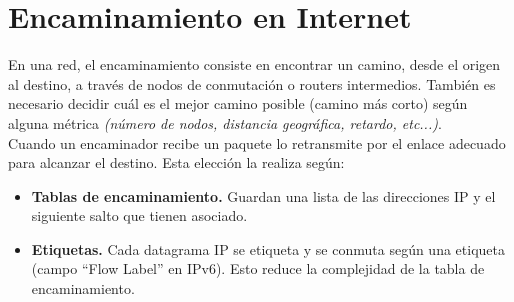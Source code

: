 \section{Encaminamiento en Internet}
En una red, el encaminamiento consiste en encontrar un camino, desde el origen al destino, a través de nodos de conmutación o routers intermedios. También es necesario decidir cuál es el mejor camino posible (camino más corto) según alguna métrica \textit{(número de nodos, distancia geográfica, retardo, etc...)}.\\

Cuando un encaminador recibe un paquete lo retransmite por el enlace
adecuado para alcanzar el destino. Esta elección la realiza según:

\begin{itemize}
    \item \textbf{Tablas de encaminamiento.} Guardan una lista de las direcciones IP y el siguiente salto que tienen asociado.
    \item \textbf{Etiquetas.} Cada datagrama IP se etiqueta y se conmuta según una etiqueta (campo \enquote{Flow Label} en IPv6). Esto reduce la complejidad de la tabla de encaminamiento.
\end{itemize}
